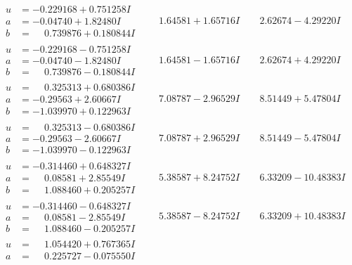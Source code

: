 \documentclass[1p]{elsarticle_modified}
\theoremstyle{definition}
\begin{document}
$$\begin{array}{c|c|c}
\begin{aligned}
u &= -0.229168 + 0.751258 I \\
a &= -0.04740 + 1.82480 I \\
b &= \phantom{-}0.739876 + 0.180844 I\end{aligned}
 & \phantom{-}1.64581 + 1.65716 I & \phantom{-}2.62674 - 4.29220 I \\ \hline\begin{aligned}
u &= -0.229168 - 0.751258 I \\
a &= -0.04740 - 1.82480 I \\
b &= \phantom{-}0.739876 - 0.180844 I\end{aligned}
 & \phantom{-}1.64581 - 1.65716 I & \phantom{-}2.62674 + 4.29220 I \\ \hline\begin{aligned}
u &= \phantom{-}0.325313 + 0.680386 I \\
a &= -0.29563 + 2.60667 I \\
b &= -1.039970 + 0.122963 I\end{aligned}
 & \phantom{-}7.08787 - 2.96529 I & \phantom{-}8.51449 + 5.47804 I \\ \hline\begin{aligned}
u &= \phantom{-}0.325313 - 0.680386 I \\
a &= -0.29563 - 2.60667 I \\
b &= -1.039970 - 0.122963 I\end{aligned}
 & \phantom{-}7.08787 + 2.96529 I & \phantom{-}8.51449 - 5.47804 I \\ \hline\begin{aligned}
u &= -0.314460 + 0.648327 I \\
a &= \phantom{-}0.08581 + 2.85549 I \\
b &= \phantom{-}1.088460 + 0.205257 I\end{aligned}
 & \phantom{-}5.38587 + 8.24752 I & \phantom{-}6.33209 - 10.48383 I \\ \hline\begin{aligned}
u &= -0.314460 - 0.648327 I \\
a &= \phantom{-}0.08581 - 2.85549 I \\
b &= \phantom{-}1.088460 - 0.205257 I\end{aligned}
 & \phantom{-}5.38587 - 8.24752 I & \phantom{-}6.33209 + 10.48383 I \\ \hline\begin{aligned}
u &= \phantom{-}1.054420 + 0.767365 I \\
a &= \phantom{-}0.225727 - 0.075550 I \\

\end{aligned}
\end{array}$$
\end{document}
